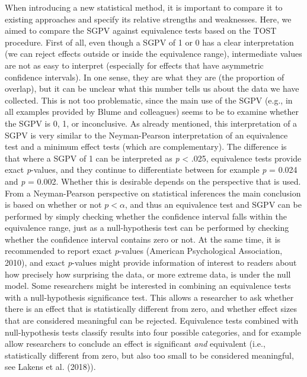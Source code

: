 \documentclass[,man,floatsintext]{apa6}
\begin{document}
When introducing a new statistical method, it is important to compare it
to existing approaches and specify its relative strengths and
weaknesses. Here, we aimed to compare the SGPV against equivalence tests
based on the TOST procedure. First of all, even though a SGPV of 1 or 0
has a clear interpretation (we can reject effects outside or inside the
equivalence range), intermediate values are not as easy to interpret
(especially for effects that have asymmetric confidence intervals). In
one sense, they are what they are (the proportion of overlap), but it
can be unclear what this number tells us about the data we have
collected. This is not too problematic, since the main use of the SGPV
(e.g., in all examples provided by Blume and colleagues) seems to be to
examine whether the SGPV is 0, 1, or inconclusive. As already mentioned,
this interpretation of a SGPV is very similar to the Neyman-Pearson
interpretation of an equivalence test and a minimum effect tests (which
are complementary). The difference is that where a SGPV of 1 can be
interpreted as \emph{p} \textless{} .025, equivalence tests provide
exact \emph{p}-values, and they continue to differentiate between for
example \emph{p} = 0.024 and \emph{p} = 0.002. Whether this is desirable
depends on the perspective that is used. From a Neyman-Pearson
perspective on statistical inferences the main conclusion is based on
whether or not \(p < \alpha\), and thus an equivalence test and SGPV can
be performed by simply checking whether the confidence interval falls
within the equivalence range, just as a null-hypothesis test can be
performed by checking whether the confidence interval contains zero or
not. At the same time, it is recommended to report exact \emph{p}-values
(American Psychological Association, 2010), and exact \emph{p}-values
might provide information of interest to readers about how precisely how
surprising the data, or more extreme data, is under the null model. Some
researchers might be interested in combining an equivalence tests with a
null-hypothesis significance test. This allows a researcher to ask
whether there is an effect that is statistically different from zero,
and whether effect sizes that are considered meaningful can be rejected.
Equivalence tests combined with null-hypothesis tests classify results
into four possible categories, and for example allow researchers to
conclude an effect is significant \emph{and} equivalent (i.e.,
statistically different from zero, but also too small to be considered
meaningful, see Lakens et al. (2018)).
\end{document}

